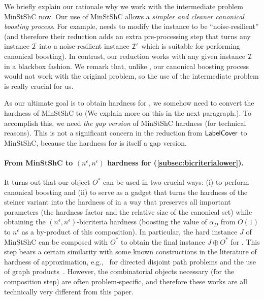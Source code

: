 We briefly explain our rationale why we work with the intermediate problem {\sf MinStShC} now. Our use of {\sf MinStShC} allows a \textit{simpler and cleaner canonical boosting process}. For example, \cite{BhattacharyyaGJRW12} needs to modify the \labcov{} instance to be ``noise-resilient''  (and therefore their reduction adds an extra pre-processing step that turns any \labcov{} instance $\mathcal{I}$ into a noise-resilient instance $\mathcal{I}'$ which is suitable for performing canonical boosting). In contrast, our reduction works with  any given \labcov{} instance $\mathcal{I}$ in a blackbox fashion. %
We remark that, unlike \cite{BhattacharyyaGJRW12}, our canonical boosting process would not work with the original \os{} problem, so the use of the intermediate problem is really crucial for us. 

As our ultimate goal is to obtain hardness for \os{}, we somehow need to convert the hardness of {\sf MinStShC} to \os (We explain more on this in the next paragraph.). To accomplish this, we need \textit{the gap version} of {\sf MinStShC} hardness (for technical reasons). This is not a significant concern in the reduction from ${\sf LabelCover}{}$ to {\sf MinStShC}, because the hardness for \labcov{} is itself a gap version.






\paragraph{From {\sf MinStShC} to $(n^{\epsilon}, n^{\epsilon})$ hardness for \os{} (\cref{subsec:bicriterialower}).}
It turns out that our object $O^*$ can be used in two crucial ways: (i) to perform canonical boosting and (ii) to serve as a gadget that turns the hardness of the steiner variant into the hardness of \os{} in a way that preserves all important parameters (the hardness factor and the relative size of the canonical set) while obtaining the $(n^{\epsilon}, n^{\epsilon})$-bicriteria hardness (boosting the value of $\alpha_D$ from $O(1)$ to $n^{\epsilon}$ as a by-product of this composition). 
In particular, the hard instance $J$ of {\sf MinStShC} can be composed with $O^*$ to obtain the final instance $J \oplus O^*$ for \os{}. 
This  step bears a certain similarity with some known constructions in the literature of hardness of approximation, e.g.,~\cite{guruswami1999near,chuzhoy2009polynomial} for directed disjoint path problems and the use of graph products~\cite{chalermsook2014pre,chalermsook2013graph}. However, the combinatorial objects necessary (for the composition step) are often problem-specific, and therefore these works are all technically very different  from this paper. 


